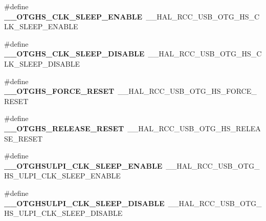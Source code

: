 \begin{DoxyCompactItemize}
\item 
\#define {\bfseries \+\_\+\+\_\+\+O\+T\+G\+H\+S\+\_\+\+C\+L\+K\+\_\+\+S\+L\+E\+E\+P\+\_\+\+E\+N\+A\+B\+LE}~\+\_\+\+\_\+\+H\+A\+L\+\_\+\+R\+C\+C\+\_\+\+U\+S\+B\+\_\+\+O\+T\+G\+\_\+\+H\+S\+\_\+\+C\+L\+K\+\_\+\+S\+L\+E\+E\+P\+\_\+\+E\+N\+A\+B\+LE\hypertarget{group___h_a_l___r_c_c___aliased_ga7aa05a4c64e6d307e0538338cb5346ae}{}\label{group___h_a_l___r_c_c___aliased_ga7aa05a4c64e6d307e0538338cb5346ae}

\item 
\#define {\bfseries \+\_\+\+\_\+\+O\+T\+G\+H\+S\+\_\+\+C\+L\+K\+\_\+\+S\+L\+E\+E\+P\+\_\+\+D\+I\+S\+A\+B\+LE}~\+\_\+\+\_\+\+H\+A\+L\+\_\+\+R\+C\+C\+\_\+\+U\+S\+B\+\_\+\+O\+T\+G\+\_\+\+H\+S\+\_\+\+C\+L\+K\+\_\+\+S\+L\+E\+E\+P\+\_\+\+D\+I\+S\+A\+B\+LE\hypertarget{group___h_a_l___r_c_c___aliased_ga77eea2dcfeb357b89e47b20498fec495}{}\label{group___h_a_l___r_c_c___aliased_ga77eea2dcfeb357b89e47b20498fec495}

\item 
\#define {\bfseries \+\_\+\+\_\+\+O\+T\+G\+H\+S\+\_\+\+F\+O\+R\+C\+E\+\_\+\+R\+E\+S\+ET}~\+\_\+\+\_\+\+H\+A\+L\+\_\+\+R\+C\+C\+\_\+\+U\+S\+B\+\_\+\+O\+T\+G\+\_\+\+H\+S\+\_\+\+F\+O\+R\+C\+E\+\_\+\+R\+E\+S\+ET\hypertarget{group___h_a_l___r_c_c___aliased_gaec3f4bab1369b3387a356f9b6cd72e4e}{}\label{group___h_a_l___r_c_c___aliased_gaec3f4bab1369b3387a356f9b6cd72e4e}

\item 
\#define {\bfseries \+\_\+\+\_\+\+O\+T\+G\+H\+S\+\_\+\+R\+E\+L\+E\+A\+S\+E\+\_\+\+R\+E\+S\+ET}~\+\_\+\+\_\+\+H\+A\+L\+\_\+\+R\+C\+C\+\_\+\+U\+S\+B\+\_\+\+O\+T\+G\+\_\+\+H\+S\+\_\+\+R\+E\+L\+E\+A\+S\+E\+\_\+\+R\+E\+S\+ET\hypertarget{group___h_a_l___r_c_c___aliased_ga5ef24faa523bf384944f24d3f151b730}{}\label{group___h_a_l___r_c_c___aliased_ga5ef24faa523bf384944f24d3f151b730}

\item 
\#define {\bfseries \+\_\+\+\_\+\+O\+T\+G\+H\+S\+U\+L\+P\+I\+\_\+\+C\+L\+K\+\_\+\+S\+L\+E\+E\+P\+\_\+\+E\+N\+A\+B\+LE}~\+\_\+\+\_\+\+H\+A\+L\+\_\+\+R\+C\+C\+\_\+\+U\+S\+B\+\_\+\+O\+T\+G\+\_\+\+H\+S\+\_\+\+U\+L\+P\+I\+\_\+\+C\+L\+K\+\_\+\+S\+L\+E\+E\+P\+\_\+\+E\+N\+A\+B\+LE\hypertarget{group___h_a_l___r_c_c___aliased_gab87bb1271d72ce25a81fdd16cae6c0c9}{}\label{group___h_a_l___r_c_c___aliased_gab87bb1271d72ce25a81fdd16cae6c0c9}

\item 
\#define {\bfseries \+\_\+\+\_\+\+O\+T\+G\+H\+S\+U\+L\+P\+I\+\_\+\+C\+L\+K\+\_\+\+S\+L\+E\+E\+P\+\_\+\+D\+I\+S\+A\+B\+LE}~\+\_\+\+\_\+\+H\+A\+L\+\_\+\+R\+C\+C\+\_\+\+U\+S\+B\+\_\+\+O\+T\+G\+\_\+\+H\+S\+\_\+\+U\+L\+P\+I\+\_\+\+C\+L\+K\+\_\+\+S\+L\+E\+E\+P\+\_\+\+D\+I\+S\+A\+B\+LE\hypertarget{group___h_a_l___r_c_c___aliased_ga0e57c00bbe387c32eab17d0bd990a314}{}\label{group___h_a_l___r_c_c___aliased_ga0e57c00bbe387c32eab17d0bd990a314}


\end{DoxyCompactItemize}
